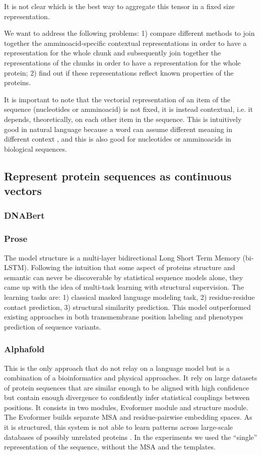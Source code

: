 \documentclass[12pt, letterpaper, twocolumn]{article}
\begin{document}
It is not clear which is the best way to aggregate this tensor in a fixed size representation.

We want to address the following problems: 1) compare different methods to join together the amminoacid-specific contextual representations in order to have a representation for the whole chunk and subsequently join together the representations of the chunks in order to have a representation for the whole protein; 2) find out if these representations reflect known properties of the proteins.

It is important to note that the vectorial representation of an item of the sequence (nucleotides or amminoacid) is not fixed, it is instead contextual, i.e. it depends, theoretically, on each other item in the sequence. This is intuitively good in natural language because a word can assume different meaning in different context \cite{salant2017contextualized}, and this is also good for nucleotides or amminoacids in biological sequences.

\subsection{Represent protein sequences as continuous vectors}

\subsubsection{DNABert}

\subsubsection{Prose \cite{bepler2021learning}}
The model structure is a multi-layer bidirectional Long Short Term Memory (bi-LSTM). Following the intuition that some aspect of proteins structure and semantic can never be discoverable by statistical sequence models alone, they came up with the idea of multi-task learning with structural supervision. The learning tasks are: 1) classical masked language modeling task, 2) residue-residue contact prediction, 3) structural similarity prediction. This model outperformed existing approaches in both transmembrane position labeling and phenotypes prediction of sequence variants.

\subsubsection{Alphafold \cite{jumper2021highly}}
This is the only approach that do not relay on a language model but is a combination of a bioinformatics and physical approaches.
It rely on large datasets of protein sequences that are similar enough to be aligned with high confidence but contain enough divergence to confidently infer statistical couplings between positions. It consists in two modules, Evoformer module and structure module. The Evoformer builds separate MSA and residue-pairwise embedding spaces. As it is structured, this system is not able to learn patterns across large-scale databases of possibly unrelated proteins \cite{bepler2021learning}.
In the experiments we used the ``single'' representation of the sequence, without the MSA and the templates.
\end{document}
